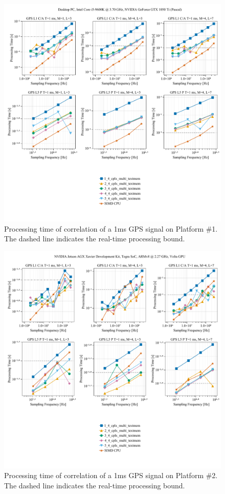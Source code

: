 \documentclass{juliacon}
\begin{document}
\begin{figure}[t]
  \centering
  \includegraphics[scale=0.6]{desktop_allplots.pdf}
  \caption{Processing time of correlation of a 1ms GPS signal on Platform \#1. The dashed line indicates the real-time processing bound.}
  \label{fig:dekstop}
\end{figure}
\begin{figure}[b]
    \centering
    \includegraphics[scale=0.6]{jetson_allplots.pdf}
    \caption{Processing time of correlation of a 1ms GPS signal on Platform \#2. The dashed line indicates the real-time processing bound.}
    \label{fig:jetson}
\end{figure}
\end{document}
